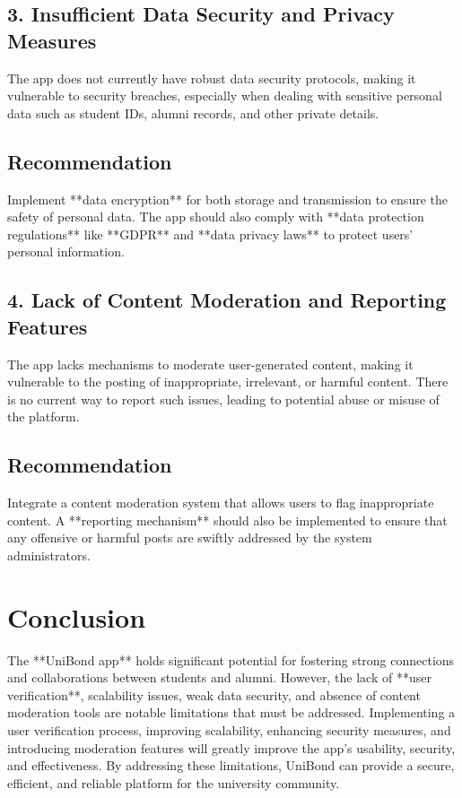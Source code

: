 \documentclass{article}
\begin{document}
\subsection*{3. Insufficient Data Security and Privacy Measures}
The app does not currently have robust data security protocols, making it vulnerable to security breaches, especially when dealing with sensitive personal data such as student IDs, alumni records, and other private details.

\subsection*{Recommendation}
Implement **data encryption** for both storage and transmission to ensure the safety of personal data. The app should also comply with **data protection regulations** like **GDPR** and **data privacy laws** to protect users' personal information.

\subsection*{4. Lack of Content Moderation and Reporting Features}
The app lacks mechanisms to moderate user-generated content, making it vulnerable to the posting of inappropriate, irrelevant, or harmful content. There is no current way to report such issues, leading to potential abuse or misuse of the platform.

\subsection*{Recommendation}
Integrate a content moderation system that allows users to flag inappropriate content. A **reporting mechanism** should also be implemented to ensure that any offensive or harmful posts are swiftly addressed by the system administrators.

\section*{Conclusion}
The **UniBond app** holds significant potential for fostering strong connections and collaborations between students and alumni. However, the lack of **user verification**, scalability issues, weak data security, and absence of content moderation tools are notable limitations that must be addressed. Implementing a user verification process, improving scalability, enhancing security measures, and introducing moderation features will greatly improve the app’s usability, security, and effectiveness. By addressing these limitations, UniBond can provide a secure, efficient, and reliable platform for the university community.
\end{document}
